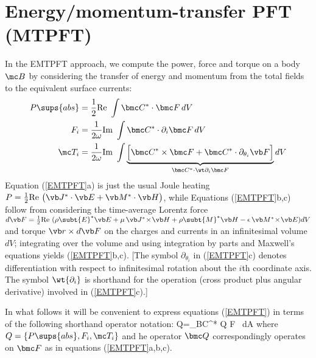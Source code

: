 \newpage
\section{Energy/momentum-transfer PFT (MTPFT)}

In the EMTPFT approach, we compute the power, force and torque
on a body $\mc B$ by considering the transfer of energy and
momentum from the total fields to the equivalent surface currents:
\begin{subequations}
\begin{align}
 P\sups{abs}&=\frac{1}{2}\text{Re }\int \bmc C^* \cdot \bmc F \, dV 
\\
 F_i&=\frac{1}{2\omega}\text{Im }\int \bmc C^* \cdot \partial_i \bmc F \, dV
\\
 \mc T_i
 &=\frac{1}{2\omega}\text{Im }\int
 \underbrace{
 \Big[   \bmc C^* \times \bmc F 
       + \bmc C^* \cdot \partial_{\theta_i} \vb F\Big]
            }_{\bmc C^* \cdot \wt \partial_i \bmc F}dV
\end{align}
\label{EMTPFT}%
\end{subequations}%
Equation (\ref{EMTPFT}a) is just the usual Joule heating
$P=\frac{1}{2}\text{Re } \big(\vb J^*\cdot \vb E + \vb M^* \cdot \vb H\big)$,
while Equations (\ref{EMTPFT}b,c) follow from considering the time-average
Lorentz force 
$d\vb F=\frac{1}{2}\text{Re }
      (\rho\subt{E}^* \vb E + \mu\, \vb J^* \! \times \! \vb H
      +\rho\subt{M}^* \vb H - \epsilon\, \vb M^* \! \times \! \vb E
      )dV
$
and torque $\vb r\times d\vb F$ on the charges and currents
in an infinitesimal volume $dV$; integrating over the
volume and using integration by parts and Maxwell's equations
yields (\ref{EMTPFT}b,c). [The symbol $\partial_{\theta_i}$
in (\ref{EMTPFT}c) denotes differentiation with 
respect to infinitesimal rotation about the $i$th coordinate 
axis. The symbol $\wt{\partial_i}$ is shorthand for the 
operation (cross product plus angular derivative)
involved in (\ref{EMTPFT}c).]

In what follows it will be convenient to express equations
(\ref{EMTPFT}) in terms of the following shorthand operator notation:
{
 Q=\int_{\partial \mc B}\bmc C^* \bmc Q \bmc F \, dA
}
where $Q=\{P\sups{abs}, F_i, \mc T_i\}$ and
he operator $\bmc Q$ correspondingly operates on $\bmc F$ as
in equations (\ref{EMTPFT}a,b,c).

